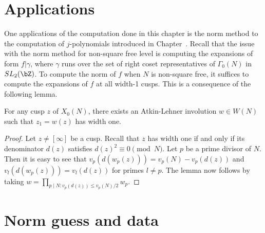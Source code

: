 \documentclass [11pt, proquest] {uwthesis}[2015/03/03]
\begin{document}
\iffalse
\begin{align*}
	a_1(f, \frac{1}{10}) &= \frac{1}{5} \zeta_{5}^{3} - \frac{3}{5} \zeta_{5}^{2} + \frac{3}{5} \zeta_{5} - \frac{1}{5} \\ 
	a_1(f, \frac{3}{10}) &= \frac{3}{5} \zeta_{5}^{3} + \frac{6}{5} \zeta_{5}^{2} + \frac{4}{5} \zeta_{5} + \frac{2}{5} \\
	a_1(f, \frac{7}{10}) &= \frac{2}{5} \zeta_{5}^{3} - \frac{1}{5} \zeta_{5}^{2} - \frac{4}{5} \zeta_{5} - \frac{2}{5}\\
	a_1(f, \frac{9}{10}) &=-\frac{6}{5} \zeta_{5}^{3} - \frac{2}{5} \zeta_{5}^{2} - \frac{3}{5} \zeta_{5} - \frac{4}{5}
\end{align*}
\fi


\section{Applications}

One applications of the computation done in this chapter is the norm method to the computation of $j$-polynomials 
introduced in Chapter~. Recall that the issue with the norm method for non-square free level is computing the 
expansions of form $f | \gamma$, where $\gamma$ runs over the set of right coset representatives of $\Gamma_0(N)$ 
in $SL_2(\bZ)$. To compute the norm of  $f$ when $N$ is non-square free, it suffices to compute the expansions of 
$f$ at all width-1 cusps. This is a consequence of the following lemma.

\begin{Lemma}
For any cusp $z$ of $X_0(N)$, there exists an Atkin-Lehner involution $w \in W(N)$ such that $z_1 = w(z)$ has 
width one.
\end{Lemma}

\begin{proof}
Let $z \neq [\infty]$ be a cusp. Recall that $z$ has width one if and only if its denominator $d(z)$ satisfies
$d(z)^2 \equiv 0 \pmod{N}$. Let $p$ be a prime divisor of $N$. Then it is easy to see that 
$v_p(d(w_p(z))) = v_p(N) -  v_p(d(z))$ and $v_l(d(w_p(z))) = v_l(d(z))$ for primes $l \neq p$. The lemma now follows by taking $w = \prod_{p \mid N: v_p(d(z)) \leq v_p(N)/2} w_p$. 
\end{proof}

\section{Norm guess and data}
 
 
 
\end{document}
